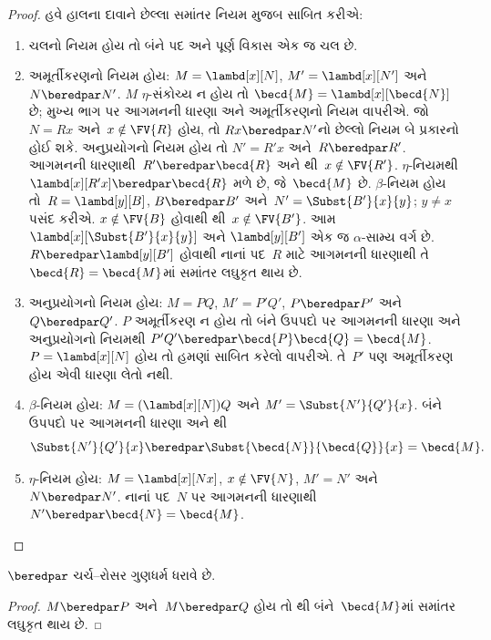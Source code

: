 \documentclass[../../../include/open-logic-section]{subfiles}
\begin{document}
\begin{proof}
  હવે હાલના દાવાને છેલ્લા સમાંતર નિયમ મુજબ સાબિત કરીએ:
  \begin{enumerate}
  \item ચલનો નિયમ હોય તો બંને પદ અને પૂર્ણ વિકાસ એક જ ચલ છે.
  \item અમૂર્તીકરણનો નિયમ હોય:
    $M=\lambd[x][N]$, $M'=\lambd[x][N']$ અને
    $N\beredpar N'$.
    $M$ $\eta$-સંકોચ્ય ન હોય તો
    $\becd{M}=\lambd[x][\becd{N}]$ છે;
    મુખ્ય ભાગ પર આગમનની ધારણા અને અમૂર્તીકરણનો નિયમ વાપરીએ.
    જો~$N=Rx$ અને~$x\notin\FV{R}$ હોય, તો
    $Rx\beredpar N'$નો છેલ્લો નિયમ બે પ્રકારનો હોઈ શકે.
    અનુપ્રયોગનો નિયમ હોય તો
    $N'=R'x$ અને~$R\beredpar R'$.
    આગમનની ધારણાથી~$R'\beredpar\becd{R}$ અને
    થી~$x\notin\FV{R'}$.
    $\eta$-નિયમથી~$\lambd[x][R'x]\beredpar\becd{R}$
    મળે છે, જે~$\becd{M}$ છે.
    $\beta$-નિયમ હોય તો~$R=\lambd[y][B]$,
    $B\beredpar B'$ અને~$N'=\Subst{B'}{x}{y}$;
    $y\neq x$ પસંદ કરીએ.
    $x\notin\FV{B}$ હોવાથી
    થી~$x\notin\FV{B'}$.
    આમ~$\lambd[x][\Subst{B'}{x}{y}]$ અને
    $\lambd[y][B']$ એક જ $\alpha$-સામ્ય વર્ગ છે.
    $R\beredpar\lambd[y][B']$ હોવાથી નાનાં પદ~$R$
    માટે આગમનની ધારણાથી તે~$\becd{R}=\becd{M}$માં
    સમાંતર લઘુકૃત થાય છે.
  \item અનુપ્રયોગનો નિયમ હોય:
    $M=PQ$, $M'=P'Q'$, $P\beredpar P'$ અને
    $Q\beredpar Q'$.
    $P$ અમૂર્તીકરણ ન હોય તો બંને ઉપપદો પર આગમનની
    ધારણા અને અનુપ્રયોગનો નિયમથી
    $P'Q'\beredpar\becd{P}\becd{Q}=\becd{M}$.
    $P=\lambd[x][N]$ હોય તો હમણાં સાબિત કરેલો
     વાપરીએ.
    તે~$P'$ પણ અમૂર્તીકરણ હોય એવી ધારણા લેતો નથી.
  \item $\beta$-નિયમ હોય:
    $M=(\lambd[x][N])Q$ અને
    $M'=\Subst{N'}{Q'}{x}$.
    બંને ઉપપદો પર આગમનની ધારણા અને
    થી
    \[
    \Subst{N'}{Q'}{x}\beredpar
    \Subst{\becd{N}}{\becd{Q}}{x}=\becd{M}.
    \]
  \item $\eta$-નિયમ હોય:
    $M=\lambd[x][Nx]$, $x\notin\FV{N}$,
    $M'=N'$ અને~$N\beredpar N'$.
    નાનાં પદ~$N$ પર આગમનની ધારણાથી
    $N'\beredpar\becd{N}=\becd{M}$.
  \end{enumerate}
\end{proof}


\begin{thm}
  $\beredpar$ ચર્ચ--રોસર ગુણધર્મ ધરાવે છે.
\end{thm}

\begin{proof}
  $M\beredpar P$ અને~$M\beredpar Q$ હોય તો
  થી બંને~$\becd{M}$માં સમાંતર લઘુકૃત થાય છે.
\end{proof}
\end{document}
